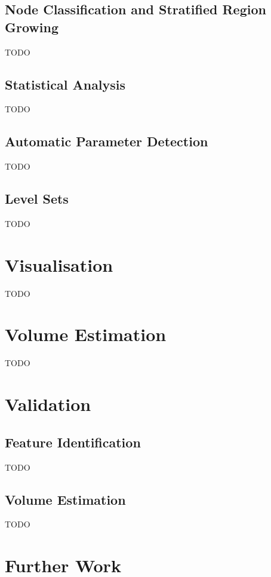 \documentclass[preprint,a4paper]{elsarticle}
\begin{document}
\subsection{Node Classification and Stratified Region Growing}

TODO

\subsection{Statistical Analysis}

TODO

\subsection{Automatic Parameter Detection}

TODO

\subsection{Level Sets}

TODO

\section{Visualisation}

TODO

\section{Volume Estimation}

TODO

\section{Validation}

\subsection{Feature Identification}

TODO

\subsection{Volume Estimation}

TODO

\section{Further Work}
\end{document}
